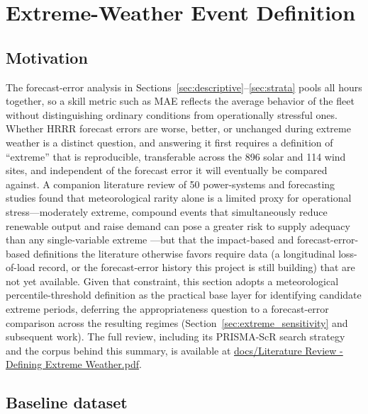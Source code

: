 \section{Extreme-Weather Event Definition}\label{sec:extreme_def}

\subsection{Motivation}

The forecast-error analysis in Sections~\ref{sec:descriptive}--\ref{sec:strata} pools all hours
together, so a skill metric such as MAE reflects the average behavior of the fleet without
distinguishing ordinary conditions from operationally stressful ones. Whether HRRR forecast errors
are worse, better, or unchanged during extreme weather is a distinct question, and answering it
first requires a definition of ``extreme'' that is reproducible, transferable across the
\num{896} solar and \num{114} wind sites, and independent of the forecast error it will eventually
be compared against. A companion literature review of 50 power-systems and forecasting studies
\citep{murong2026litreview} found that meteorological rarity alone is a limited proxy for
operational stress---moderately extreme, compound events that simultaneously reduce renewable
output and raise demand can pose a greater risk to supply adequacy than any single-variable
extreme \citep{chen2026}---but that the impact-based and forecast-error-based definitions the
literature otherwise favors require data (a longitudinal loss-of-load record, or the
forecast-error history this project is still building) that are not yet available. Given that
constraint, this section adopts a meteorological percentile-threshold definition as the practical
base layer for identifying candidate extreme periods, deferring the appropriateness question to a
forecast-error comparison across the resulting regimes (Section~\ref{sec:extreme_sensitivity} and
subsequent work). The full review, including its PRISMA-ScR search strategy and the corpus behind
this summary, is available at \url{docs/Literature Review - Defining Extreme Weather.pdf}.

\subsection{Baseline dataset}

